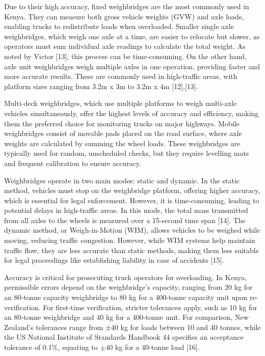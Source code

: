 Due to their high accuracy, fixed weighbridges are the most commonly used in Kenya. They can measure both gross vehicle weights (GVW) and axle loads, enabling trucks to redistribute loads when overloaded. Smaller single axle weighbridges, which weigh one axle at a time, are easier to relocate but slower, as operators must sum individual axle readings to calculate the total weight. As noted by Victor [13], this process can be time-consuming. On the other hand, axle unit weighbridges weigh multiple axles in one operation, providing faster and more accurate results. These are commonly used in high-traffic areas, with platform sizes ranging from 3.2m x 3m to 3.2m x 4m [12],[13].

Multi-deck weighbridges, which use multiple platforms to weigh multi-axle vehicles simultaneously, offer the highest levels of accuracy and efficiency, making them the preferred choice for monitoring trucks on major highways. Mobile weighbridges consist of movable pads placed on the road surface, where axle weights are calculated by summing the wheel loads. These weighbridges are typically used for random, unscheduled checks, but they require levelling mats and frequent calibration to ensure accuracy.

Weighbridges operate in two main modes: static and dynamic. In the static method, vehicles must stop on the weighbridge platform, offering higher accuracy, which is essential for legal enforcement. However, it is time-consuming, leading to potential delays in high-traffic areas. In this mode, the total mass transmitted from all axles to the wheels is measured over a 15-second time span [14]. The dynamic method, or Weigh-in-Motion (WIM), allows vehicles to be weighed while moving, reducing traffic congestion. However, while WIM systems help maintain traffic flow, they are less accurate than static methods, making them less suitable for legal proceedings like establishing liability in case of accidents [15].

Accuracy is critical for prosecuting truck operators for overloading. In Kenya, permissible errors depend on the weighbridge's capacity, ranging from 20 kg for an 80-tonne capacity weighbridge to 80 kg for a 400-tonne capacity unit upon re-verification. For first-time verification, stricter tolerances apply, such as 10 kg for an 80-tonne weighbridge and 40 kg for a 400-tonne unit. For comparison, New Zealand's tolerances range from ±40 kg for loads between 10 and 40 tonnes, while the US National Institute of Standards Handbook 44 specifies an acceptance tolerance of 0.1\%, equating to $\pm$40 kg for a 40-tonne load [16].

